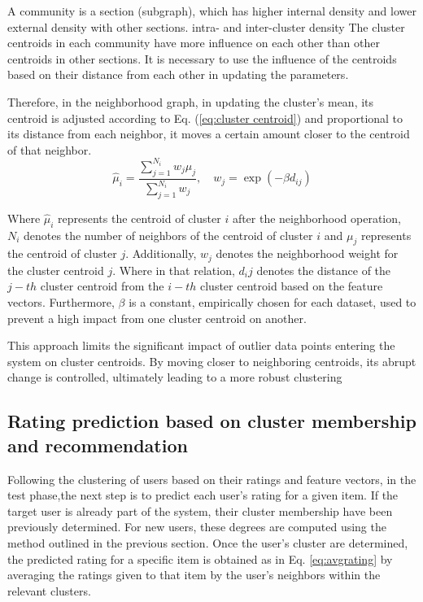 \documentclass{article}
\begin{document}
A community is a section (subgraph), which has higher internal density and lower external density with other sections. 
intra- and inter-cluster density
The cluster centroids in each community have more influence on each other than other centroids in other sections. It is necessary to use the influence of the centroids based on their distance from each other in updating the parameters. 

Therefore, in the neighborhood graph, in updating the cluster’s mean, its centroid is adjusted according to Eq. (\ref{eq:cluster centroid}) and proportional to its distance from each neighbor, it moves a certain amount closer to the centroid of that neighbor.
\begin{equation}\label{eq:cluster centroid}
    \hat{\mu}_i = \frac{\sum_{j=1}^{N_i}w_j \mu_j}{\sum_{j=1}^{N_i}w_j}, \quad w_j = \exp(-\beta d_{ij})
\end{equation}

Where $\hat{\mu}_i$ represents the centroid of cluster $i$ after the neighborhood operation, $N_i$ denotes the number of neighbors of the centroid of cluster $i$ and $\mu_j$ represents the centroid of cluster $j$. Additionally, $w_j$ denotes the neighborhood weight for the cluster centroid $j$. Where in that relation, $d_ij$ denotes the distance of the $j-th$ cluster centroid from the $i-th$ cluster centroid based on the feature vectors. Furthermore, $\beta$ is a constant, empirically chosen for each dataset, used to prevent a high impact from one cluster centroid on another.

This approach limits the significant impact of outlier data points entering the system on cluster centroids. By moving closer to neighboring centroids, its abrupt change is controlled, ultimately leading to a more robust clustering

\subsection{Rating prediction based on cluster membership and recommendation}
Following the clustering of users based on their ratings and feature vectors, in the test phase,the next step is to predict each user's rating for a given item. If the target user is already part of the system, their cluster membership have been previously determined. For new users, these degrees are computed using the method outlined in the previous section. Once the user’s cluster are determined, the predicted rating for a specific item is obtained as in Eq. \ref{eq:avgrating} by averaging the ratings given to that item by the user’s neighbors within the relevant clusters.
\end{document}
